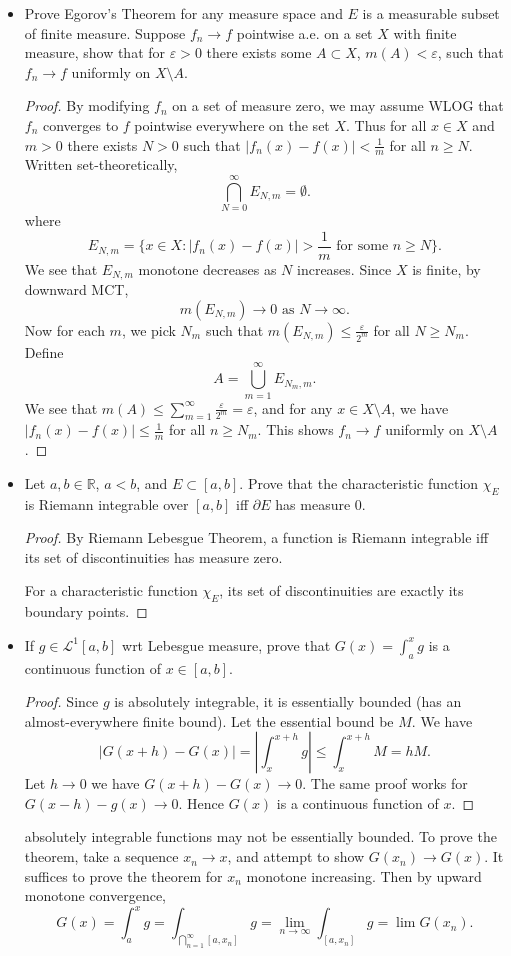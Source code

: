 \begin{itemize}
	\item Prove Egorov's Theorem for any measure space and $E$ is a measurable subset of finite measure. Suppose $f_n \to  f$ pointwise a.e. on a set $X$ with finite measure, show that for $\varepsilon>0$ there exists some $A \subset X$, $m(A) < \varepsilon$, such that $f_n \to  f$ uniformly on $X \setminus A$.
\begin{proof}
	By modifying $f_n$ on a set of measure zero, we may assume WLOG that $f_n$ converges to $f$ pointwise everywhere on the set $X$. Thus for all $x \in X$ and $m > 0$ there exists $N > 0$ such that $|f_n(x) - f(x)| < \frac{1}{m}$ for all $n \ge  N$. Written set-theoretically,
	\[
		\bigcap _{N = 0}^\infty  E_{N, m} = \emptyset 
	.\] 
	where
	\[
		E_{N, m}= \{x \in X: |f_n(x) - f(x)| > \frac{1}{m} \text{ for some } n \ge N\} 
	.\] 
	We see that $E_{N, m}$ monotone decreases as $N$ increases. Since $X$ is finite, by downward MCT, 
	\[
		m(E_{N, m}) \to  0 \text{ as } N \to \infty 
	.\] 
	Now for each $m$, we pick $N_m$ such that $m(E_{N, m}) \le  \frac{\varepsilon}{2^m}$ for all $N \ge  N_m$. Define
	\[
		A = \bigcup_{m = 1} ^\infty E_{N_m, m}
	.\] 
	We see that $m(A) \le \sum_{m=1}^{\infty} \frac{\varepsilon}{2^m} = \varepsilon$, and for any $x \in X\setminus A$, we have $\left| f_n(x) - f(x) \right| \le \frac{1}{m}$ for all $n \ge  N_m$. This shows $f_n \to f$ uniformly on $X \setminus A$.
\end{proof}

	\item Let $a, b \in \mathbb{R}$, $a < b$, and $E \subset [a, b]$. Prove that the characteristic function $\chi_E$ is Riemann integrable over $[a,b]$ iff $\partial E$ has measure $0$.
\begin{proof}
	By Riemann Lebesgue Theorem, a function is Riemann integrable iff its set of discontinuities has measure zero. 

	For a characteristic function $\chi_E$, its set of discontinuities are exactly its boundary points.
\end{proof}

	\item If $g \in \mathcal{L}^1[a, b]$ wrt Lebesgue measure, prove that $G(x) = \int _a^x g$ is a continuous function of $x \in [a,b]$.
\begin{proof}
	Since $g$ is absolutely integrable, it is essentially bounded (has an almost-everywhere finite bound). Let the essential bound be $M$. We have
	\[
	|G(x+h) - G(x)| = \left|\int _x^{x+h} g\right| \le \int _x^{x+h}M = hM
	.\] 
	Let $h\to 0$ we have $G(x+h) - G(x) \to 0$. The same proof works for $G(x-h) - g(x) \to 0$. Hence $G(x)$ is a continuous function of $x$.
\end{proof}
\begin{correction}
	absolutely integrable functions may not be essentially bounded. To prove the theorem, take a sequence $x_n \to  x$, and attempt to show $G(x_n) \to  G(x)$. It suffices to prove the theorem for $x_n$ monotone increasing. Then by upward monotone convergence,
	\[
		G(x) = \int _a^x g = \int _{\bigcap_{n = 1}^\infty [a, x_n] } g = \lim_{n \to \infty} \int _{[a, x_n]} g = \lim G(x_n)
	.\] 
\end{correction}


\end{itemize}
